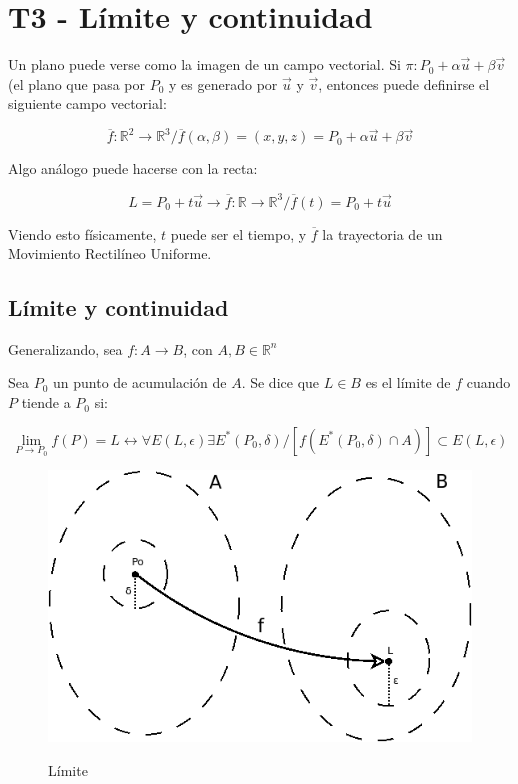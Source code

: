 \documentclass{article}
\renewcommand{\Bbb}{\mathbb}
\begin{document}
\section{T3 - Límite y continuidad}

Un plano puede verse como la imagen de un campo vectorial. Si $\pi: P_0 + \alpha \overrightarrow{u} + \beta \overrightarrow{v}$ (el plano que pasa por $P_0$ y es generado por $\overrightarrow{u}$ y $\overrightarrow{v}$, entonces puede definirse el siguiente campo vectorial:

\begin{equation}
\overline{f}: \Bbb R^2 \rightarrow \Bbb R^3 / \overline{f}(\alpha, \beta) = (x, y, z) = P_0 + \alpha \overrightarrow{u} + \beta \overrightarrow{v}
\end{equation}

Algo análogo puede hacerse con la recta:

\begin{equation}
L = P_0 + t \overrightarrow{u} \longrightarrow \overline{f}: \Bbb R \rightarrow \Bbb R^3 / \overline{f}(t) = P_0 + t \overrightarrow{u}
\end{equation}

Viendo esto físicamente, $t$ puede ser el tiempo, y $\overline{f}$ la trayectoria de un Movimiento Rectilíneo Uniforme.

\subsection{Límite y continuidad}

Generalizando, sea $f: A \rightarrow B$, con $A, B \in \Bbb R^n$

Sea $P_0$ un punto de acumulación de $A$. Se dice que $L \in B$ es el límite de $f$ cuando $P$ tiende a $P_0$ si:

\begin{equation}
\lim_{P \rightarrow P_0}f(P) = L \longleftrightarrow \forall E(L, \epsilon) \exists E^*(P_0, \delta) / [f(E^*(P_0, \delta) \cap A)] \subset E(L, \epsilon)
\end{equation}

\begin{figure}[t]
\caption{Límite}
\includegraphics[scale=0.75]{img/teo_fig002_limite.png} 
\centering
\label{fig:limite}
\end{figure}
\end{document}
